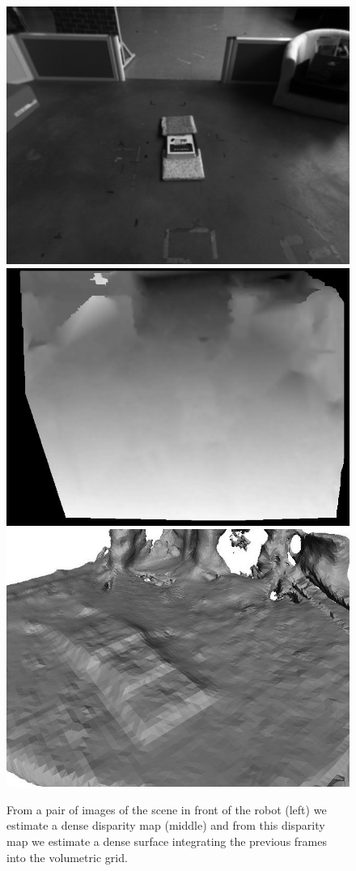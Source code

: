 \begin{figure}[h]
\centering
\includegraphics[scale=0.17]{Chap6-3D-Reconstruction/right0001}
\hspace{0.2cm}
\includegraphics[scale=0.17]{Chap6-3D-Reconstruction/left0001_disp}
\hspace{0.2cm}
\includegraphics[scale=0.22]{Chap6-3D-Reconstruction/snapshot02}
\caption[]{From a pair of images of the scene in front of the robot (left) we estimate a dense disparity map (middle) and from this disparity map we estimate a dense surface integrating the previous frames into the volumetric grid.}
\label{Fig:Reconstruction}
\end{figure}